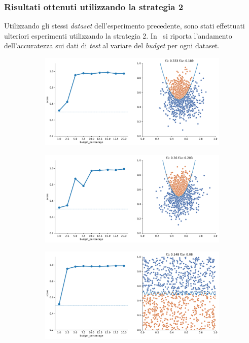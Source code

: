 \subsubsection{Risultati ottenuti utilizzando la strategia 2}
Utilizzando gli stessi \emph{dataset} dell'esperimento precedente, sono stati effettuati ulteriori esperimenti utilizzando la strategia 2.
In~ si riporta l'andamento dell'accuratezza sui dati di \emph{test} al variare del \emph{budget} per ogni dataset.
\begin{figure}
    \begin{subfigure}{.5\textwidth}
        \centering
        \includegraphics[width=\textwidth]{img/2d_v2/4.pdf}
    \end{subfigure}%
    \begin{subfigure}{.5\textwidth}
        \centering
        \includegraphics[width=\textwidth]{img/2d_v2/5.pdf}
    \end{subfigure}
    \hfill
    \begin{subfigure}{.5\textwidth}
        \centering
        \includegraphics[width=\textwidth]{img/2d_v2/7.pdf}

\end{subfigure}
\end{figure}
